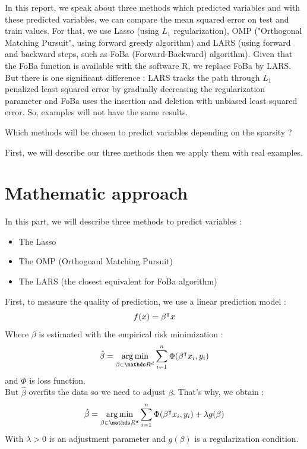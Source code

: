 \documentclass{article}
\begin{document}
\sloppy
{}


In this report, we speak about three methods which predicted variables and with these predicted variables, we can compare the mean squared error on test and train values. For that, we use Lasso (using $L_1$ regularization), OMP ("Orthogonal Matching Pursuit", using forward greedy algorithm) and LARS (using forward and backward steps, such as FoBa (Forward-Backward) algorithm). Given that the FoBa function is available with the software R, we replace FoBa by LARS. But there is one significant difference : LARS tracks the path through $L_1$ penalized least squared error by gradually decreasing the regularization parameter and FoBa uses the insertion and deletion with unbiased least squared error. So, examples will not have the same results.\\
\begin{center}
    Which methods will be chosen to predict variables depending on the sparsity ?
\end{center}
First, we will describe our three methods then we apply them with real examples.


\section{Mathematic approach}
In this part, we will describe three methods to predict variables :
\begin{itemize}
    \item The Lasso 
    \item The OMP (Orthogoanl Matching Pursuit)
    \item The LARS (the closest equivalent for FoBa algorithm)
\end{itemize}

First, to measure the quality of prediction, we use a linear prediction model :
\[ f(x)={\beta}^\intercal x\]
Where $\beta$ is estimated with the empirical risk minimization : \[\hat{\beta}= \underset{\beta \in \R^d}\argmin \sum_{i=1}^n \Phi(\trans\beta x_i, y_i)\]
and $\Phi$ is loss function.\\
But $\hat{\beta}$ overfits the data so we need to adjust $\beta$. That's why, we obtain :
\[\hat{\beta} = \underset{\beta \in \R^d}{\argmin} \sum_{i=1}^n \Phi (\trans{\beta}x_i, y_i)+ \lambda g(\beta)\]
With $\lambda >0$ is an adjustment parameter and $g(\beta)$ is a regularization condition.
\end{document}
